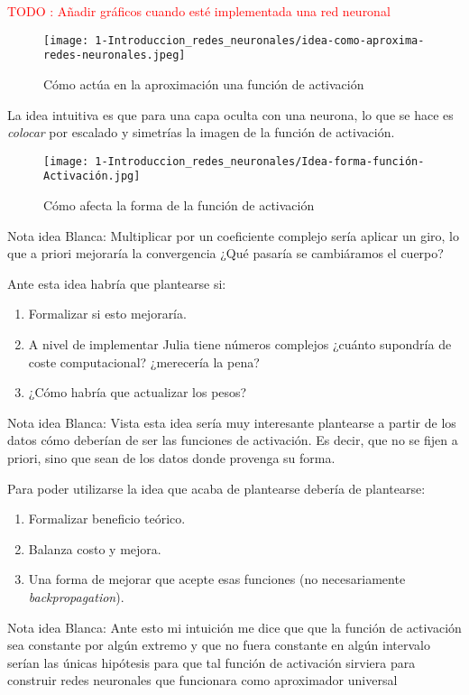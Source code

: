 \textcolor{red}{TODO : Añadir gráficos cuando esté implementada una red neuronal}

\begin{figure}[h!]
    \texttt{[image: 1-Introduccion\_redes\_neuronales/idea-como-aproxima-redes-neuronales.jpeg]}
    \caption{Cómo actúa en la aproximación una función de activación}
    \label{img:idea-como-aproxima-redes-neuronales}
   \end{figure}

La idea intuitiva es que para una capa oculta con una neurona, 
lo que se hace es \textit{colocar} por escalado y simetrías la imagen de la función de activación. 

\begin{figure}[h!]
    \texttt{[image: 1-Introduccion\_redes\_neuronales/Idea-forma-función-Activación.jpg]}
    \caption{Cómo afecta la forma de la función de activación}
    \label{img:como afecta la forma de la función de aproximación}
   \end{figure}

\textcolor{dark_green}{Nota idea Blanca: Multiplicar por un coeficiente complejo sería aplicar un giro,
 lo que a priori mejoraría la convergencia
 ¿Qué pasaría se cambiáramos el cuerpo?}

Ante esta idea habría que plantearse si: 

\begin{enumerate}
    \item Formalizar si esto mejoraría.
    \item A nivel de implementar Julia tiene números complejos ¿cuánto supondría de coste computacional? ¿merecería la pena?
    \item ¿Cómo habría que actualizar los pesos?
\end{enumerate}

\textcolor{dark_green}{Nota idea Blanca: Vista esta idea sería muy interesante plantearse a partir de los datos cómo deberían de ser las funciones de activación. Es decir, que no se fijen a priori, sino que sean de los datos donde provenga su forma.}

Para poder utilizarse la idea que acaba de plantearse debería de plantearse: 
\begin{enumerate}
    \item Formalizar beneficio teórico.
    \item Balanza costo y mejora.
    \item Una forma de mejorar que acepte esas funciones (no necesariamente \textit{backpropagation}).
\end{enumerate}

\textcolor{dark_green}{Nota idea Blanca: Ante esto mi intuición me dice que que la función de activación sea constante por algún extremo y que no fuera constante en algún intervalo serían las únicas hipótesis para que tal función de activación sirviera para construir redes neuronales que funcionara como aproximador universal}


